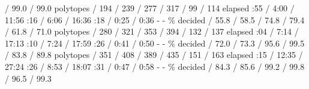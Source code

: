              / 99.0 / 99.0 \eTD
        \eTR
        \bTR[topframe=on]
             \eTH
            \bTD polytopes \eTD
             / 194 / 239 \eTD
             / 277 / 317 \eTD
             / 99 / 114 \eTD
            \bTD  \eTD
            \bTD  \eTD
        \eTR
        \bTR
            \bTD elapsed \eTD
            :55 / 4:00 / 11:56 \eTD
            :16 / 6:06 / 16:36 \eTD
            :18 / 0:25 / 0:36 \eTD
            \bTD - \eTD
            \bTD - \eTD
        \eTR
        \bTR
            \bTD \% decided \eTD
             / 55.8 / 58.5 \eTD
             / 74.8 / 79.4 \eTD
             / 61.8 / 71.0 \eTD
            \bTD  \eTD
            \bTD  \eTD
        \eTR
        \bTR[topframe=on]
             \eTH
            \bTD polytopes \eTD
             / 280 / 321 \eTD
             / 353 / 394 \eTD
             / 132 / 137 \eTD
            \bTD  \eTD
            \bTD  \eTD
        \eTR
        \bTR
            \bTD elapsed \eTD
            :04 / 7:14 / 17:13 \eTD
            :10 / 7:24 / 17:59 \eTD
            :26 / 0:41 / 0:50 \eTD
            \bTD - \eTD
            \bTD - \eTD
        \eTR
        \bTR
            \bTD \% decided \eTD
             / 72.0 / 73.3 \eTD
             / 95.6 / 99.5 \eTD
             / 83.8 / 89.8 \eTD
            \bTD  \eTD
            \bTD  \eTD
        \eTR
        \bTR[topframe=on]
             \eTH
            \bTD polytopes \eTD
             / 351 / 408 \eTD
             / 389 / 435 \eTD
             / 151 / 163 \eTD
            \bTD  \eTD
            \bTD  \eTD
        \eTR
        \bTR
            \bTD elapsed \eTD
            :15 / 12:35 / 27:24 \eTD
            :26 / 8:53 / 18:07 \eTD
            :31 / 0:47 / 0:58 \eTD
            \bTD - \eTD
            \bTD - \eTD
        \eTR
        \bTR
            \bTD \% decided \eTD
             / 84.3 / 85.6 \eTD
             / 99.2 / 99.8 \eTD
             / 96.5 / 99.3 \eTD
            \bTD  \eTD
            \bTD  \eTD
        \eTR
    \eTABLE
\stopbuffer

\startsubsection[title={Results},reference=sec:cases-integrator-results]


